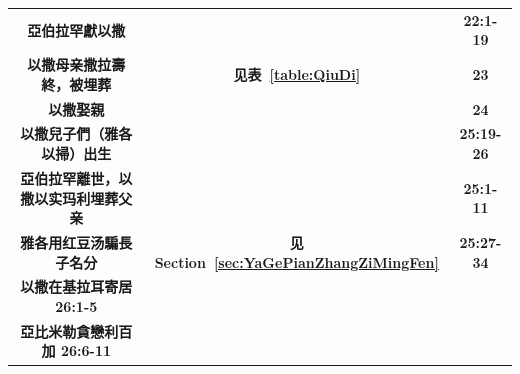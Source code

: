 \begin{table}[H]
\begin{threeparttable}
\begin{tabular}{c c c}
\multicolumn{1}{L{\dimexpr0.5\linewidth-1\tabcolsep\relax}}{\bfseries 亞伯拉罕獻以撒 }  
& \multicolumn{1}{L{\dimexpr0.2\linewidth-1\tabcolsep\relax}}{\bfseries }
& \multicolumn{1}{L{\dimexpr0.1\linewidth-1\tabcolsep\relax}}{\bfseries 22:1-19}\\ 

\multicolumn{1}{L{\dimexpr0.5\linewidth-1\tabcolsep\relax}}{\bfseries 以撒母亲撒拉壽終，被埋葬}  
& \multicolumn{1}{L{\dimexpr0.2\linewidth-1\tabcolsep\relax}}{\bfseries 见表~\ref{table:QiuDi}}
& \multicolumn{1}{L{\dimexpr0.1\linewidth-1\tabcolsep\relax}}{\bfseries 23}\\ 

\multicolumn{1}{L{\dimexpr0.5\linewidth-1\tabcolsep\relax}}{\bfseries 以撒娶親 }  
& \multicolumn{1}{L{\dimexpr0.2\linewidth-1\tabcolsep\relax}}{\bfseries }
& \multicolumn{1}{L{\dimexpr0.1\linewidth-1\tabcolsep\relax}}{\bfseries 24}\\ 

\multicolumn{1}{L{\dimexpr0.5\linewidth-1\tabcolsep\relax}}{\bfseries 以撒兒子們（雅各以掃）出生 }  
& \multicolumn{1}{L{\dimexpr0.2\linewidth-1\tabcolsep\relax}}{\bfseries }
& \multicolumn{1}{L{\dimexpr0.1\linewidth-1\tabcolsep\relax}}{\bfseries 25:19-26}\\ 

\multicolumn{1}{L{\dimexpr0.5\linewidth-1\tabcolsep\relax}}{\bfseries 亞伯拉罕離世，以撒以实玛利埋葬父亲}  
& \multicolumn{1}{L{\dimexpr0.2\linewidth-1\tabcolsep\relax}}{\bfseries }
& \multicolumn{1}{L{\dimexpr0.1\linewidth-1\tabcolsep\relax}}{\bfseries 25:1-11}\\ 

\multicolumn{1}{L{\dimexpr0.5\linewidth-1\tabcolsep\relax}}{\bfseries 雅各用红豆汤騙長子名分 }  
& \multicolumn{1}{L{\dimexpr0.2\linewidth-1\tabcolsep\relax}}{\bfseries 见Section~\ref{sec:YaGePianZhangZiMingFen}}
& \multicolumn{1}{L{\dimexpr0.1\linewidth-1\tabcolsep\relax}}{\bfseries 25:27-34}\\ 

\multicolumn{1}{L{\dimexpr0.5\linewidth-1\tabcolsep\relax}}{\bfseries 以撒在基拉耳寄居 26:1-5 }  
& \multicolumn{1}{L{\dimexpr0.2\linewidth-1\tabcolsep\relax}}{\bfseries }
& \multicolumn{1}{L{\dimexpr0.1\linewidth-1\tabcolsep\relax}}{\bfseries }\\ 

\multicolumn{1}{L{\dimexpr0.5\linewidth-1\tabcolsep\relax}}{\bfseries 亞比米勒貪戀利百加 26:6-11}  
& \multicolumn{1}{L{\dimexpr0.2\linewidth-1\tabcolsep\relax}}{\bfseries }
& \multicolumn{1}{L{\dimexpr0.1\linewidth-1\tabcolsep\relax}}{\bfseries }\\ 


\end{tabular}
\end{threeparttable}
\end{table}

